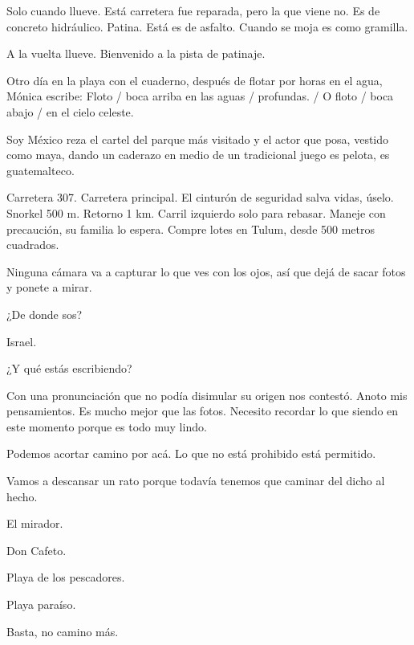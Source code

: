 \documentclass[11pt,twoside,openright,a6paper]{book}
\begin{document}
Solo cuando llueve. Está carretera fue reparada, pero la que viene no. Es de concreto hidráulico. Patina. Está es de asfalto. Cuando se moja es como gramilla.


\vspace{1.5cm}
A la vuelta llueve. Bienvenido a la pista de patinaje.


\vspace{1.5cm}
Otro día en la playa con el cuaderno, después de flotar por horas en el agua, Mónica escribe: Floto / boca arriba en las aguas / profundas. / O floto / boca abajo / en el cielo celeste.


\vspace{1.5cm}
Soy México reza el cartel del parque más visitado y el actor que posa, vestido como maya, dando un caderazo en medio de un tradicional juego es pelota, es guatemalteco.


\vspace{1.5cm}
Carretera 307. Carretera principal. El cinturón de seguridad salva vidas, úselo. Snorkel 500  m. Retorno 1 km. Carril izquierdo solo para rebasar. Maneje con precaución, su familia lo espera. Compre lotes en Tulum, desde 500 metros cuadrados.


\vspace{1.5cm}
Ninguna cámara va a capturar lo que ves con los ojos, así que dejá de sacar fotos y ponete a mirar.


\vspace{1.5cm}
¿De donde sos?

Israel.

¿Y qué estás escribiendo?

Con una pronunciación que no podía disimular su origen nos contestó. Anoto mis pensamientos. Es mucho mejor que las fotos. Necesito recordar lo que siendo en este momento porque es todo muy lindo.


\vspace{1.5cm}
Podemos acortar camino por acá. Lo que no está prohibido está permitido.


\vspace{1.5cm}
Vamos a descansar un rato porque todavía tenemos que caminar del dicho al hecho.


\vspace{1.5cm}
El mirador.

Don Cafeto.

Playa de los pescadores.

Playa paraíso.

Basta, no camino más.
\end{document}

